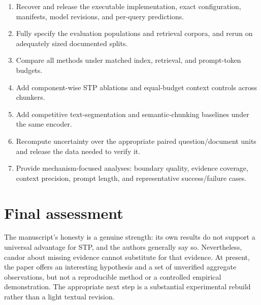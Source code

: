 \documentclass[11pt]{article}
\begin{document}
\begin{enumerate}
  \item Recover and release the executable implementation, exact configuration, manifests, model revisions, and per-query predictions.
  \item Fully specify the evaluation populations and retrieval corpora, and rerun on adequately sized documented splits.
  \item Compare all methods under matched index, retrieval, and prompt-token budgets.
  \item Add component-wise STP ablations and equal-budget context controls across chunkers.
  \item Add competitive text-segmentation and semantic-chunking baselines under the same encoder.
  \item Recompute uncertainty over the appropriate paired question/document units and release the data needed to verify it.
  \item Provide mechanism-focused analyses: boundary quality, evidence coverage, context precision, prompt length, and representative success/failure cases.
\end{enumerate}

\section*{Final assessment}

The manuscript's honesty is a genuine strength: its own results do not support a universal advantage for STP, and the authors generally say so. Nevertheless, candor about missing evidence cannot substitute for that evidence. At present, the paper offers an interesting hypothesis and a set of unverified aggregate observations, but not a reproducible method or a controlled empirical demonstration. The appropriate next step is a substantial experimental rebuild rather than a light textual revision.
\end{document}
